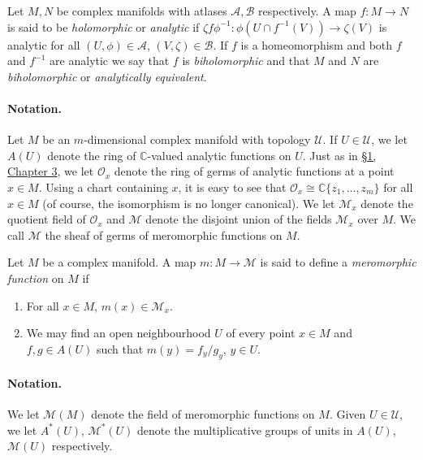  Let $M,N$ be complex manifolds with atlases $\mathcal A,\mathcal B$ respectively. A map $f:M\longrightarrow N$ is said to be \emph{holomorphic} or \emph{analytic} if $\zeta f\phi^{-1}:\phi(U\cap f^{-1}(V))\longrightarrow\zeta(V)$ is analytic for all $(U,\phi)\in\mathcal A$, $(V,\zeta)\in\mathcal B$. If $f$ is a homeomorphism and both $f$ and $f^{-1}$ are analytic we say that $f$ is \emph{biholomorphic} and that $M$ and $N$ are \emph{biholomorphic} or \emph{analytically equivalent}.

\paragraph*{Notation.} Let $M$ be an $m$-dimensional complex manifold with topology $\mathcal U$. If $U\in\mathcal U$, we let $A(U)$ denote the ring of $\mathbb C$-valued analytic functions on $U$. Just as in \hyperref[sec:3:1]{\S1, Chapter 3}, we let $\mathcal O_x$ denote the ring of germs of analytic functions at a point $x\in M$. Using a chart containing $x$, it is easy to see that $\mathcal O_x\cong\mathbb C\{z_1,\ldots,z_m\}$ for all $x\in M$ (of course,
the isomorphism is no longer canonical). We let $\mathcal M_x$ denote the quotient field of $\mathcal O_x$ and $\mathcal M$ denote the disjoint union of the fields $\mathcal M_x$ over $M$. We call $\mathcal M$ the sheaf of germs of meromorphic functions on $M$.

 Let $M$ be a complex manifold. A map $m:M\longrightarrow\mathcal M$ is said to define a \emph{meromorphic function} on $M$ if
\begin{enumerate}
\item For all $x\in M$, $m(x)\in\mathcal M_x$.
\item We may find an open neighbourhood $U$ of every point $x\in M$ and $f,g\in A(U)$ such that $m(y)=f_y/g_y$, $y\in U$.
\end{enumerate}

\paragraph*{Notation.} We let $\mathcal M(M)$ denote the field of meromorphic functions on $M$. Given $U\in\mathcal U$, we let $A^*(U)$, $\mathcal M^*(U)$ denote the multiplicative groups of units in $A(U)$, $\mathcal M(U)$ respectively.

